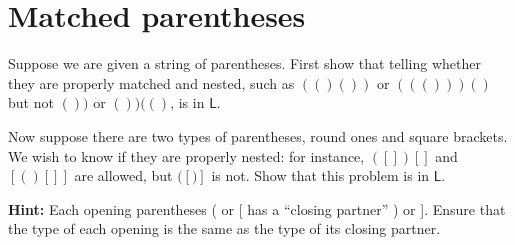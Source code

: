 

\maketitle
\thispagestyle{firststyle}
\vspace{-2.0cm}


\section{Matched parentheses}
Suppose we are given a string of parentheses.
First show that telling whether they are properly matched and nested,
such as $(()())$ or $((()))()$ but not $())$ or $())(()$,
is in $\mathsf{L}$.

Now suppose there are two types of parentheses, round ones and square brackets.
We wish to know if they are properly nested: for instance,
$([])[]$ and $[()[]]$ are allowed,
but $([)]$ is not.
Show that this problem is in $\mathsf{L}$.

    {\bf Hint:} Each opening parentheses ( or [ has a ``closing partner'' ) or ].
Ensure that the type of each opening is the same as the type of its closing partner.




